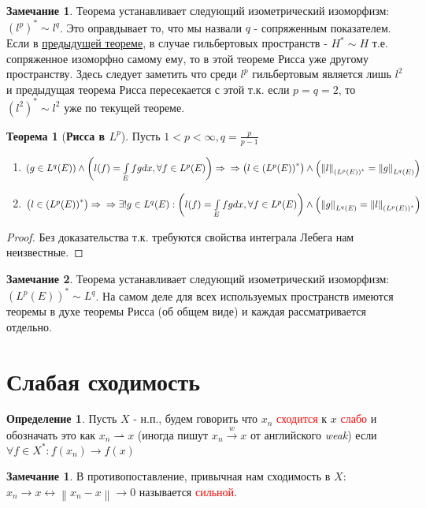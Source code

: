\documentclass[12pt,a4paper]{article}
\theoremstyle{definition}
\newtheorem{theorem}{Теорема}
\newtheorem{definition}{Определение}[section]
\newtheorem{corollarydf}{Замечание}[definition]
\newtheorem{corollaryth}{Замечание}[theorem]
\newcommand{\norm}[1]{\left\lVert#1\right\rVert}
\newcommand{\conj}[1]{\left(#1\right)^*}
\newcommand{\weakto}{\rightharpoonup}
\begin{document}
\begin{corollaryth}
	Теорема устанавливает следующий изометрический изоморфизм: $\conj{l^p} \sim l^q$. Это оправдывает то, что мы назвали $q$ - сопряженным показателем. Если в \hyperref[th:2]{предыдущей теореме}, в случае гильбертовых пространств - $H^* \sim H$ т.е. сопряженное изоморфно самому ему, то в этой теореме Рисса уже другому пространству. Здесь следует заметить что среди $l^p$ гильбертовым является лишь $l^2$ и предыдущая теорема Рисса пересекается с этой т.к. если $p = q = 2$, то $\conj{l^2} \sim l^2$ уже по текущей теореме.
\end{corollaryth}


\begin{theorem}[\textbf{Рисса в $L^p$}]
	Пусть $1 < p < \infty, q = \frac{p}{p-1}$
	\begin{enumerate}
		\item $(g \in L^q (E)) \wedge \left(l(f) = \int\limits_{E}{fg dx}, \forall f \in L^p (E)\right) \Rightarrow \\ \Rightarrow \left(l \in \conj{L^p (E)}\right) \wedge \left(\norm{l}_{ \conj{L^p (E)} } = \norm{g}_{L^q (E)} \right)$
		\item $\left(l \in \conj{L^p (E)}\right) \Rightarrow \\ \Rightarrow \exists!g \in L^q (E): \left( l(f) = \int\limits_{E}{fg dx}, \forall f \in L^p (E)\right) \wedge \left(\norm{g}_{L^q (E)} = \norm{l}_{\conj{L^p (E)}} \right)$
	\end{enumerate}
\end{theorem}
\begin{proof}
	Без доказательства т.к. требуются свойства интеграла Лебега нам неизвестные.
\end{proof}
\begin{corollaryth}
	Теорема устанавливает следующий изометрический изоморфизм: $\conj{L^p (E)} \sim L^q$. На самом деле для всех используемых пространств имеются теоремы в духе теоремы Рисса (об общем виде) и каждая рассматривается отдельно.
\end{corollaryth}

\section{Слабая сходимость}
\begin{definition}
	Пусть $X$ - н.п., будем говорить что $x_n$ \textcolor{red}{сходится} к $x$ \textcolor{red}{слабо} и обозначать это как $x_n \weakto x$ (иногда пишут $x_n \overset{w}{\to} x$ от английского \textit{weak}) если $\forall f \in X^*: f(x_n) \to f(x)$
\end{definition}
\begin{corollarydf}
	В противопоставление, привычная нам сходимость в $X$: $x_n \to x \leftrightarrow \norm{x_n - x} \to 0$ называется \textcolor{red}{сильной}.
\end{corollarydf}
\end{document}
